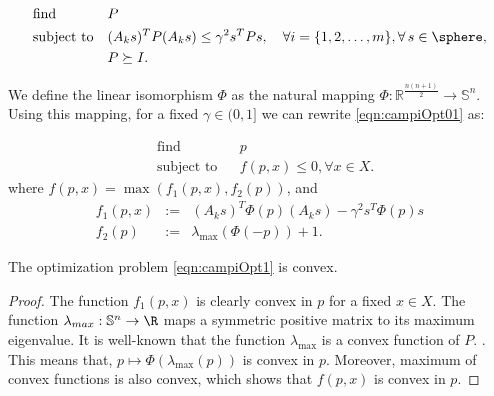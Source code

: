 \begin{equation}
\label{eqn:campiOpt01}
\begin{aligned}
& \text{find} & & P \\
& \text{subject to} 
&  & (A_ks)^TP(A_ks) \leq \gamma^2 s^TPs, \quad \forall i = \{1,2, \ldots, m\},  \forall\, s \in \sphere,\\
& & & P \succeq I.
\end{aligned}
\end{equation}

We define the linear isomorphism $\Phi$ as the natural mapping \mbox{$\Phi: \mathbb{R}^{\frac{n(n+1)}{2}} \to \mathbb{S}^n$.} Using this mapping, for a fixed $\gamma \in (0, 1]$ we can rewrite \eqref{eqn:campiOpt01} as:

\begin{equation}
\label{eqn:campiOpt1}
\begin{aligned}
& \text{find} & & p \\
& \text{subject to} 
& & f(p,x) \leq 0, \forall x \in X.
\end{aligned}
\end{equation}
where $f(p,x) = \max(f_1(p, x), f_2(p))$, and 
\begin{eqnarray*}
f_1(p,x) &:=& (A_ks)^T\Phi(p)(A_ks) - \gamma^2 s^T\Phi(p)s \\
f_2(p) &:=& \lambda_{\max}(\Phi(-p)) +1.
\end{eqnarray*}


\begin{proposition}The optimization problem \eqref{eqn:campiOpt1} is convex.
\end{proposition}

\begin{proof}The function $f_1(p,x)$ is clearly convex in $p$ for a fixed $x \in X$. The function 
$\lambda_{max}: \mathbb{S}^n \to \R$ maps a symmetric positive matrix to its maximum eigenvalue. It is well-known that the function $\lambda_{\max}$ is a convex function of $P$. \cite{boyd}. This means that, $p \mapsto \Phi(\lambda_{\max}(p))$ is convex in $p$. Moreover, maximum of convex functions is also convex, which shows that $f(p, x)$ is convex in $p$.
\end{proof}

